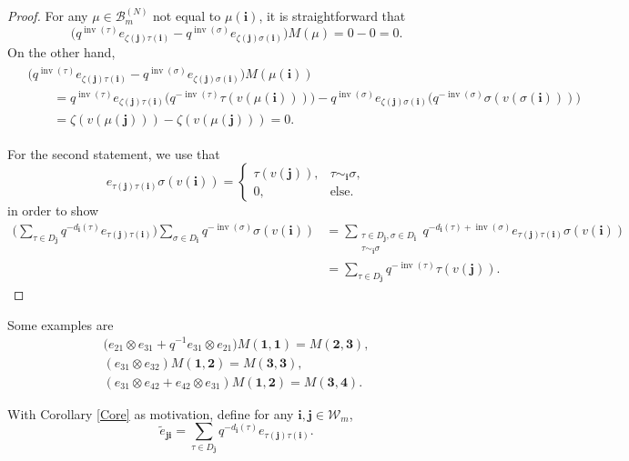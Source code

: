 \documentclass[pdftex]{sigma}
\numberwithin{equation}{section}
\DeclareMathOperator{\inv}{inv}
\newcommand{\ii}{{\mathbf{i}}}
\newcommand{\jj}{{\mathbf{j}}}
\begin{document}
\begin{proof}
For any $\mu \in \mathcal{B}^{(N)}_m$ not equal to $\mu(\ii)$, it is straightforward that
\[
\big(q^{\inv(\tau)}e_{\zeta(\jj) \tau(\ii)} - q^{\inv(\sigma)}e_{\zeta(\jj) \sigma(\ii)} \big) M(\mu)=0-0=0.
\]
On the other hand,
\begin{gather*}
\begin{split}
&\big(q^{\inv(\tau)}e_{\zeta(\jj) \tau(\ii)} - q^{\inv(\sigma)}e_{\zeta(\jj) \sigma(\ii)} \big) M(\mu(\ii))\\
&\qquad = q^{\inv(\tau)}e_{\zeta(\jj) \tau(\ii)} \big(q^{-\inv(\tau)} \tau(v(\mu(\ii)) )\big) - q^{\inv(\sigma)}e_{\zeta(\jj) \sigma(\ii)} \big(q^{-\inv(\sigma)} \sigma(v(\sigma(\ii)) )\big) \\
&\qquad = \zeta(v(\mu(\jj))) - \zeta(v(\mu(\jj)))=0.
\end{split}
\end{gather*}

For the second statement, we use that
\[
e_{\tau(\jj)\tau(\ii)}\sigma(v(\ii))
=
\begin{cases}
\tau(v(\jj)), & \tau \sim_{\ii} \sigma, \\
0, & \text{else.}
\end{cases}
\]
in order to show
\begin{align*}
\bigg( \sum_{\tau \in D_{\jj}} q^{-d_{\ii}(\tau)}e_{\tau(\jj)\tau(\ii)} \bigg) \sum_{\sigma \in D_{\ii}} q^{-\inv(\sigma)} \sigma(v(\ii)) &= \sum_{\substack{\tau \in D_{\jj},\sigma \in D_{\ii} \\ \tau\sim_{\ii} \sigma}}q^{-d_{\ii}(\tau)+ \inv(\sigma)} e_{\tau(\jj)\tau(\ii)}\sigma(v(\ii))\\
&= \sum_{\tau \in D_{\jj}} q^{-\inv(\tau)} \tau(v(\jj)).\tag*{\qed}
\end{align*}\renewcommand{\qed}{}
\end{proof}

\begin{Example}
Some examples are
\begin{gather*}
\big(e_{21} \otimes e_{31} + q^{-1}e_{31} \otimes e_{21}\big)M(\mathbf{1,1})=M(\mathbf{2,3}),\\
(e_{31} \otimes e_{32})M(\mathbf{1,2}) = M(\mathbf{3,3}),\\
(e_{31} \otimes e_{42} + e_{42} \otimes e_{31} )M(\mathbf{1,2}) = M(\mathbf{3,4}).
\end{gather*}
\end{Example}

With Corollary \ref{Core} as motivation, define for any $\ii,\jj \in \mathcal{W}_m$,
\[
\tilde{e}_{\jj \ii} = \sum_{\tau \in D_{\jj}} q^{-d_{\ii}(\tau)}e_{\tau(\jj)\tau(\ii)} .
\]
\end{document}
